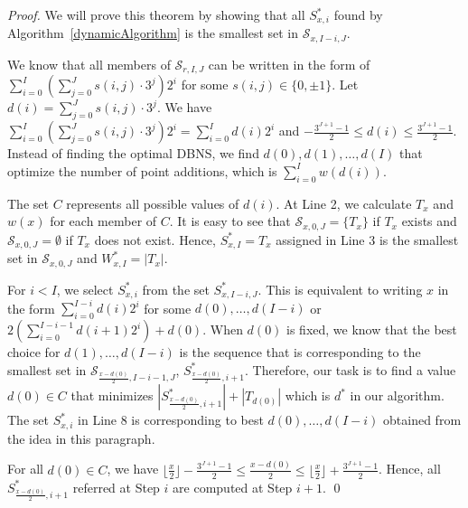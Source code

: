 \begin{proof}
We will prove this theorem by showing that all $S^*_{x,i}$ found by Algorithm~\ref{dynamicAlgorithm} is the smallest set in $\mathcal{S}_{x, I - i, J}$.

We know that all members of $\mathcal{S}_{r, I, J}$ can be written in the form of $\sum\limits_{i = 0}^I \left(\sum\limits_{j = 0}^J s(i,j) \cdot 3^j\right) 2^i$
for some $s(i,j) \in \{0, \pm 1\}$. Let $d(i) = \sum\limits_{j = 0}^J s(i,j) \cdot 3^j$.
We have $\sum\limits_{i = 0}^I \left(\sum\limits_{j = 0}^J s(i,j) \cdot 3^j\right) 2^i = \sum\limits_{i = 0}^I d(i) 2^i$
and  $-\frac{3^{J + 1} - 1}{2} \leq d(i) \leq \frac{3^{J + 1} - 1}{2}$.
Instead of finding the optimal DBNS, we find $d(0), d(1), \dots, d(I)$ that optimize the number of point additions, which is $\sum_{i = 0}^I w(d(i))$.

The set $C$ represents all possible values of $d(i)$.
At Line 2, we calculate $T_x$ and $w(x)$ for each member of $C$.
It is easy to see that $\mathcal{S}_{x, 0, J} = \{T_x\}$ if $T_x$ exists
and $\mathcal{S}_{x, 0, J} = \emptyset$ if $T_x$ does not exist.
Hence, $S_{x, I}^* = T_x$ assigned in Line 3 is the smallest set in $\mathcal{S}_{x, 0, J}$  and $W_{x, I}^* = |T_x|$.

For $i < I$, we select $S^*_{x,i}$ from the set $S^*_{x, I - i, J}$.
This is equivalent to writing $x$ in the form $\sum_{i = 0}^{I - i} d(i) 2^i$
for some $d(0), \dots, d(I - i)$ or $2 \left( \sum_{i = 0}^{I - i - 1} d(i + 1) 2^i \right) + d(0)$.
When $d(0)$ is fixed, we know that the best choice for $d(1), \dots, d(I - i)$ is the sequence that is corresponding to the smallest set in
$\mathcal{S}_{\frac{x - d(0)}{2}, I - i - 1, J}$, $S^*_{\frac{x - d(0)}{2}, i + 1}$.
Therefore, our task is to find a value $d(0) \in C$ that minimizes $\left|S^*_{\frac{x - d(0)}{2}, i + 1}\right| + \left|T_{d(0)}\right|$ which is $d^*$ in our algorithm.
The set $S^*_{x,i}$ in Line 8 is corresponding to best $d(0), \dots, d(I - i)$ obtained from the idea in this paragraph.

For all $d(0) \in C$, we have $\lfloor \frac{x}{2} \rfloor - \frac{3^{J + 1} - 1}{2} \leq \frac{x - d(0)}{2} \leq \lfloor \frac{x}{2} \rfloor + \frac{3^{J + 1} - 1}{2}$.
Hence, all $S^*_{\frac{x - d(0)}{2}, i + 1}$ referred at Step $i$ are computed at Step $i + 1$. \qed
\end{proof}  


